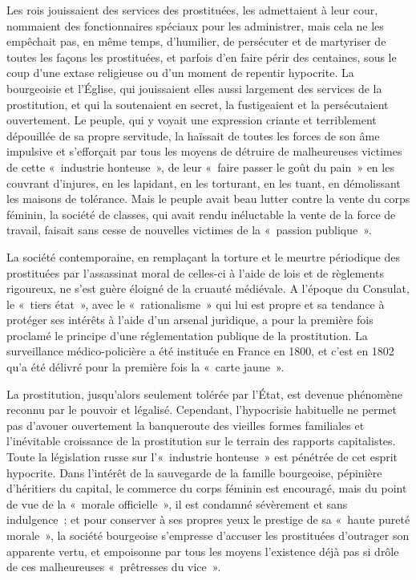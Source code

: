 \documentclass[french,twoside]{book} %
\begin{document}
Les rois jouissaient des services des prostituées, les admettaient à leur cour, nommaient des fonctionnaires spéciaux pour les administrer, mais cela ne les empêchait pas, en même temps, d’humilier, de persécuter et de martyriser de toutes les façons les prostituées, et parfois d’en faire périr des centaines, sous le coup d’une extase religieuse ou d’un moment de repentir hypocrite. La bourgeoisie et l’Église, qui jouissaient elles aussi largement des services de la prostitution, et qui la soutenaient en secret, la fustigeaient et la persécutaient ouvertement. Le peuple, qui y voyait une expression criante et terriblement dépouillée de sa propre servitude, la haïssait de toutes les forces de son âme impulsive et s’efforçait par tous les moyens de détruire de malheureuses victimes de cette « industrie honteuse », de leur « faire passer le goût du pain » en les couvrant d’injures, en les lapidant, en les torturant, en les tuant, en démolissant les maisons de tolérance. Mais le peuple avait beau lutter contre la vente du corps féminin, la société de classes, qui avait rendu inéluctable la vente de la force de travail, faisait sans cesse de nouvelles victimes de la « passion publique ».\par
La société contemporaine, en remplaçant la torture et le meurtre périodique des prostituées par l’assassinat moral de celles-ci à l’aide de lois et de règlements rigoureux, ne s’est guère éloigné de la cruauté médiévale. A l’époque du Consulat, le « tiers état », avec le « rationalisme » qui lui est propre et sa tendance à protéger ses intérêts à l’aide d’un arsenal juridique, a pour la première fois proclamé le principe d’une réglementation publique de la prostitution. La surveillance médico-policière a été instituée en France en 1800, et c’est en 1802 qu’a été délivré pour la première fois la « carte jaune ».\par
La prostitution, jusqu’alors seulement tolérée par l’État, est devenue phénomène reconnu par le pouvoir et légalisé. Cependant, l’hypocrisie habituelle ne permet pas d’avouer ouvertement la banqueroute des vieilles formes familiales et l’inévitable croissance de la prostitution sur le terrain des rapports capitalistes. Toute la législation russe sur l’« industrie honteuse » est pénétrée de cet esprit hypocrite. Dans l’intérêt de la sauvegarde de la famille bourgeoise, pépinière d’héritiers du capital, le commerce du corps féminin est encouragé, mais du point de vue de la « morale officielle », il est condamné sévèrement et sans indulgence ; et pour conserver à ses propres yeux le prestige de sa « haute pureté morale », la société bourgeoise s’empresse d’accuser les prostituées d’outrager son apparente vertu, et empoisonne par tous les moyens l’existence déjà pas si drôle de ces malheureuses « prêtresses du vice ».\par
\end{document}
